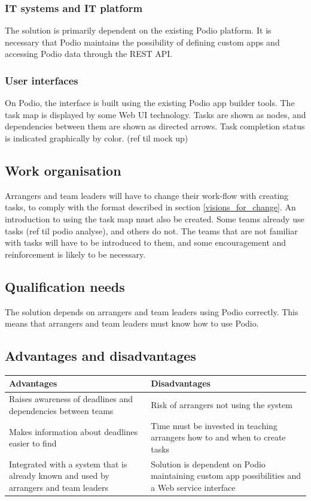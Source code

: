 \subsubsection{IT systems and IT platform}
The solution is primarily dependent on the existing Podio platform. It is necessary that Podio maintains the possibility of defining custom apps and accessing Podio data through the REST API.

\subsubsection{User interfaces}
On Podio, the interface is built using the existing Podio app builder tools. The task map is displayed by some Web UI technology. Tasks are shown as nodes, and dependencies between them are shown as directed arrows. Task completion status is indicated graphically by color. (ref til mock up)

\subsection{Work organisation}
\label{sub:work_organisation}
Arrangers and team leaders will have to change their work-flow with creating tasks, to comply with the format described in section \ref{visions_for_change}. An introduction to using the task map must also be created. Some teams already use tasks (ref til podio analyse), and others do not. The teams that are not familiar with tasks will have to be introduced to them, and some encouragement and reinforcement is likely to be necessary.

\subsection{Qualification needs}
\label{sub:qualification_needs}
The solution depends on arrangers and team leaders using Podio correctly. This means that arrangers and team leaders must know how to use Podio.

\subsection{Advantages and disadvantages}
\label{sec:advantages_disadvantages}
\begin{center}
    \begin{tabular}{ | p{7cm} | p{7cm} |}
    \hline
    \textbf{Advantages} & \textbf{Disadvantages}  \\ \hline
     Raises awareness of deadlines and dependencies between teams & Risk of arrangers not using the system\\ \hline
     Makes information about deadlines easier to find & Time must be invested in teaching arrangers how to and when to create tasks\\ \hline
     Integrated with a system that is already known and used by arrangers and team leaders & Solution is dependent on Podio maintaining custom app possibilities and a Web service interface \\ \hline
    \hline
    \end{tabular}
\end{center}


